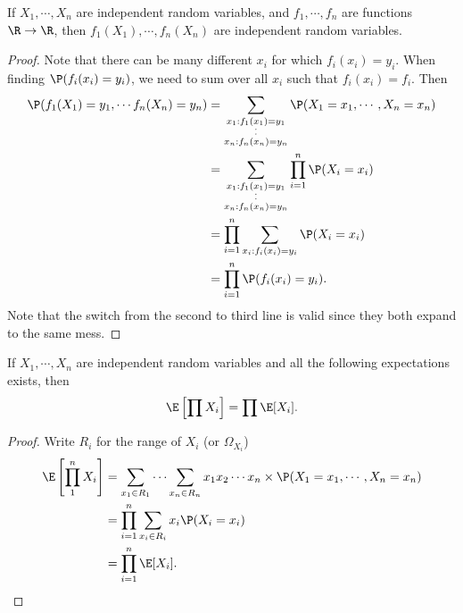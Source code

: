\documentclass[a4paper]{article}
\begin{document}
\begin{thm}
  If $X_1, \cdots, X_n$ are independent random variables, and $f_1, \cdots, f_n$ are functions $\R \to \R$, then $f_1(X_1), \cdots, f_n(X_n)$ are independent random variables.
\end{thm}

\begin{proof}
  Note that there can be many different $x_i$ for which $f_i(x_i) = y_i$. When finding $\P(f_i(x_i)= y_i)$, we need to sum over all $x_i$ such that $f_i(x_i) = f_i$. Then
  \begin{align*}
    \P(f_1(X_1) = y_1, \cdots f_n(X_n) = y_n) &= \sum_{\substack{x_1: f_1(x_1) = y_1\\\cdot\vspace{-2pt}\\\cdot\\x_n: f_n(x_n) = y_n}} \P(X_1 = x_1, \cdots, X_n = x_n)\\
    &= \sum_{\substack{x_1: f_1(x_1) = y_1\\\cdot\vspace{-2pt}\\\cdot\\x_n: f_n(x_n) = y_n}} \prod_{i = 1}^n \P(X_i = x_i)\\
    &= \prod_{i = 1}^n \sum_{x_i:f_i(x_i) = y_i} \P(X_i = x_i)\\
    &= \prod_{i = 1}^n \P(f_i(x_i) = y_i).
  \end{align*}
  Note that the switch from the second to third line is valid since they both expand to the same mess.
\end{proof}

\begin{thm}
  If $X_1, \cdots, X_n$ are independent random variables and all the following expectations exists, then
  \[
    \E\left[\prod X_i\right] = \prod \E[X_i].
  \]
\end{thm}

\begin{proof}
  Write $R_i$ for the range of $X_i$ (or $\Omega_{X_i}$)
  \begin{align*}
    \E\left[\prod_1^n X_i\right] &= \sum_{x_1\in R_1}\cdots \sum_{x_n\in R_n}x_1x_2\cdots x_n\times \P(X_1 = x_1, \cdots, X_n = x_n)\\
    &= \prod_{i = 1}^n \sum_{x_i \in R_i}x_i\P(X_i = x_i)\\
    &= \prod_{i = 1}^n \E[X_i].
  \end{align*}
\end{proof}
\end{document}
